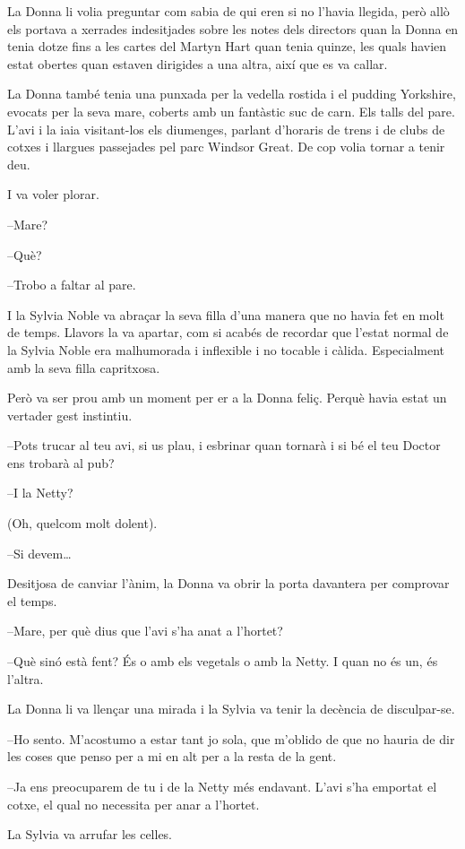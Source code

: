 La Donna li volia preguntar com sabia de qui eren si no l'havia llegida,
però allò els portava a xerrades indesitjades sobre les notes dels
directors quan la Donna en tenia dotze fins a les cartes del Martyn Hart
quan tenia quinze, les quals havien estat obertes quan estaven dirigides
a una altra, així que es va callar.

La Donna també tenia una punxada per la vedella rostida i el pudding
Yorkshire, evocats per la seva mare, coberts amb un fantàstic suc de
carn. Els talls del pare. L'avi i la iaia visitant-los els diumenges,
parlant d'horaris de trens i de clubs de cotxes i llargues passejades
pel parc Windsor Great. De cop volia tornar a tenir deu.

I va voler plorar.

--Mare?

--Què?

--Trobo a faltar al pare.

I la Sylvia Noble va abraçar la seva filla d'una manera que no havia fet
en molt de temps. Llavors la va apartar, com si acabés de recordar que
l'estat normal de la Sylvia Noble era malhumorada i inflexible i no
tocable i càlida. Especialment amb la seva filla capritxosa.

Però va ser prou amb un moment per er a la Donna feliç. Perquè havia
estat un vertader gest instintiu.

--Pots trucar al teu avi, si us plau, i esbrinar quan tornarà i si bé el
teu Doctor ens trobarà al pub?

--I la Netty?

(Oh, quelcom molt dolent).

--Si devem\ldots{}

Desitjosa de canviar l'ànim, la Donna va obrir la porta davantera per
comprovar el temps.

--Mare, per què dius que l'avi s'ha anat a l'hortet?

--Què sinó està fent? És o amb els vegetals o amb la Netty. I quan no és
un, és l'altra.

La Donna li va llençar una mirada i la Sylvia va tenir la decència de
disculpar-se.

--Ho sento. M'acostumo a estar tant jo sola, que m'oblido de que no
hauria de dir les coses que penso per a mi en alt per a la resta de la
gent.

--Ja ens preocuparem de tu i de la Netty més endavant. L'avi s'ha
emportat el cotxe, el qual no necessita per anar a l'hortet.

La Sylvia va arrufar les celles.

